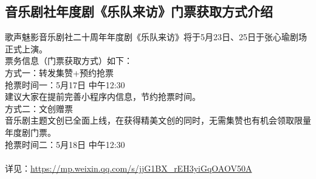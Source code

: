 \documentclass[letterpaper, 12pt]{article}
\begin{document}
\begin{multicols}{2}
\subsection{音乐剧社年度剧《乐队来访》门票获取方式介绍} %
歌声魅影音乐剧社二十周年年度剧《乐队来访》将于5月23日、25日于张心瑜剧场正式上演。
\\票务信息（门票获取方式）如下：
\\方式一：转发集赞+预约抢票
\\抢票时间一：5月17日 中午12:30
\\建议大家在提前完善小程序内信息，节约抢票时间。
\\方式二：文创赠票
\\音乐剧主题文创已全面上线，在获得精美文创的同时，无需集赞也有机会领取限量年度剧门票。
\\抢票时间二：5月18日 中午12:30
\\
\\详见：\url{https://mp.weixin.qq.com/s/jjG1BX_rEH3yiGqOAOV50A}

\end{multicols}
\end{document}
